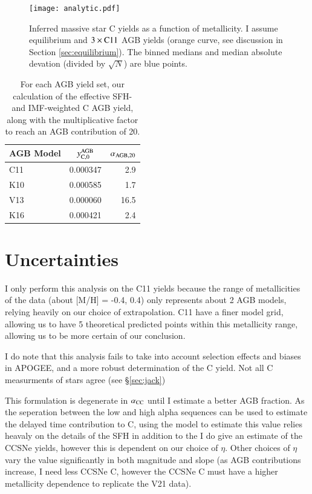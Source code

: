 \documentclass[12pt,oneside]{report}
\begin{document}
\begin{figure}
    \centering
    \texttt{[image: analytic.pdf]}
    \caption[Reverse fit yields]{Inferred massive star C yields as a function of metallicity. I assume equilibrium and $3\times {\rm C11}$ AGB yields (orange curve, see discussion in Section \ref{sec:equilibrium}). The binned medians and median absolute devation (divided by $\sqrt{N}$) are blue points.
    }
    \label{fig:analytic}
\end{figure}




\begin{table}
	\centering
    \caption[AGB net solar IMF yields]{For each AGB yield set, our calculation of the effective SFH- and IMF-weighted C AGB yield, along with the multiplicative factor to reach an AGB contribution of 20.}
	\label{tab:alpha_agb}
	\begin{tabular}{lcr} %
		\toprule 
		AGB Model & $y_{\rm C, 0}^{\rm AGB}$ & $\alpha_{\rm AGB, 20}$\\
        \midrule
		C11 & 0.000347 & 2.9\\
		K10 & 0.000585 & 1.7\\
		V13 & 0.000060 & 16.5\\
		K16 & 0.000421 & 2.4\\
		\bottomrule
	\end{tabular}
\end{table}


\section{Uncertainties}

I only perform this analysis on the C11 yields because the range of metallicities of the data (about [M/H] = -0.4, 0.4) only represents about 2 AGB models, relying heavily on our choice of extrapolation. C11 have a finer model grid, allowing us to have 5 theoretical predicted points within this metallicity range, allowing us to be more certain of our conclusion. 

I do note that this analysis fails to take into account selection effects and biases in APOGEE, and a more robust determination of the C yield. Not all C measurments of stars agree (see \S \ref{sec:jack})


This formulation is degenerate in $\alpha_{\rm CC}$ until I estimate a better AGB fraction. As the seperation between the low and high alpha sequences can be used to estimate the delayed time contribution to C, using the model to estimate this value relies heavaly on the details of the SFH in addition to the 
I do give an estimate of the CCSNe yields, however this is dependent on our choice of $\eta$. Other choices of $\eta$ vary the value significantly in both magnitude and slope (as AGB contributions increase, I need less CCSNe C, however the CCSNe C must have a higher metallicity dependence to replicate the V21 data). 
\end{document}
